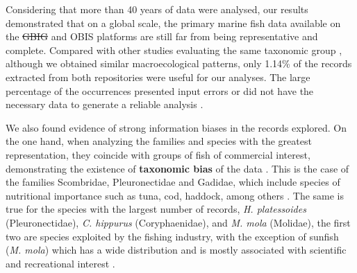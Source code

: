 \documentclass[12pt,authoryear]{elsarticle}
\providecommand{\DIFaddtex}[1]{{\protect\color{blue}\uwave{#1}}} %
\providecommand{\DIFdeltex}[1]{{\protect\color{red}\sout{#1}}}                      %
\providecommand{\DIFaddbegin}{} %
\providecommand{\DIFaddend}{} %
\providecommand{\DIFdelbegin}{} %
\providecommand{\DIFdelend}{} %
\providecommand{\DIFadd}[1]{\texorpdfstring{\DIFaddtex{#1}}{#1}} %
\providecommand{\DIFdel}[1]{\texorpdfstring{\DIFdeltex{#1}}{}} %
\begin{document}
Considering that more than 40 years of data were analysed, our results demonstrated that on a global scale, the primary marine fish data available on the \DIFdelbegin \DIFdel{GBIG }\DIFdelend \DIFaddbegin \DIFadd{GBIF }\DIFaddend and OBIS platforms are still far from being representative and complete. Compared with other studies evaluating the same taxonomic group \citep{mora2008completeness,garcia2015}, although we obtained similar macroecological patterns, only 1.14\% of the records extracted from both repositories were useful for our analyses. The large percentage of the occurrences presented input errors or did not have the necessary data to generate a reliable analysis \citep{yesson2007,garcia2014}.

We also found evidence of strong information biases in the records explored. On the one hand, when analyzing the families and species with the greatest representation, they coincide with groups of fish of commercial interest, demonstrating the existence of \textbf{taxonomic bias }of the data \citep{melo2020}. This is the case of the families Scombridae, Pleuronectidae and Gadidae, which include species of nutritional importance such as tuna, cod, haddock, among others \citep{cohen1990}. The same is true for the species with the largest number of records, \textit{H. platessoides} (Pleuronectidae), \textit{C. hippurus }(Coryphaenidae), and \textit{M. mola} (Molidae), the first two are species exploited by the fishing industry, with the exception of sunfish (\textit{M. mola}) which has a wide distribution and is mostly associated with scientific and recreational interest \citep{pope2010}.
\end{document}
